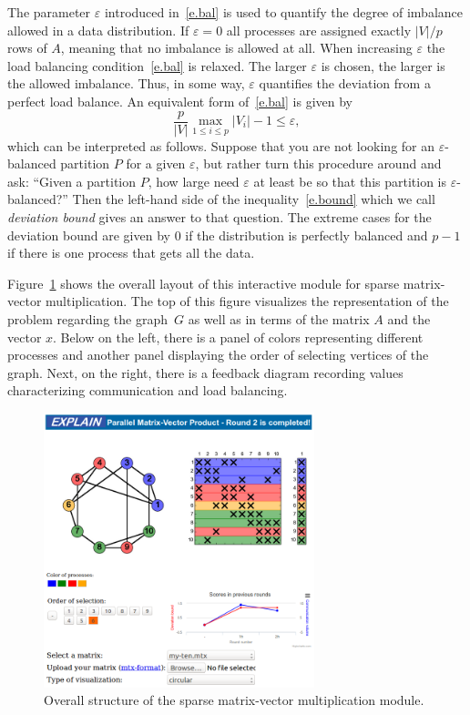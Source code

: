 \documentclass[12pt, twoside,a4paper,toc=bibliography]{scrbook}
\begin{document}
The parameter $\varepsilon$ introduced in~\eqref{e.bal} is used to quantify the degree of
imbalance allowed in a data distribution. If $\varepsilon = 0$ all processes are assigned
exactly $|V|/p$ rows of $A$, meaning that no imbalance is allowed at all. When
increasing $\varepsilon$ the load balancing condition~\eqref{e.bal} is relaxed. The
larger $\varepsilon$ is chosen, the larger is the allowed imbalance. Thus, in some way,
$\varepsilon$ quantifies the deviation from a perfect load balance. An equivalent form
of~\eqref{e.bal} is given by
\begin{equation}\label{e.bound}
\frac{p}{|V|} \max_{1 \leq i \leq p} |V_i| - 1 \leq \varepsilon ,
\end{equation}
which can be interpreted as follows. Suppose that you are not looking for an
$\varepsilon$-balanced partition $P$ for a given $\varepsilon$, but rather turn this
procedure around and ask: ``Given a partition $P$, how large need $\varepsilon$ at least
be so that this partition is $\varepsilon$-balanced?'' Then the left-hand side of the
inequality~\eqref{e.bound} which we call \emph{deviation bound} gives an answer to that
question. The extreme cases for the deviation bound are given by $0$ if the distribution is
perfectly balanced and $p-1$ if there is one process that gets all the data.

Figure~\ref{f.explain.matvec} shows the overall layout of this interactive
module for sparse matrix-vector multiplication.
The top of this figure visualizes
the representation of the problem regarding the graph~$G$ as well as in terms
of the matrix $A$ and the vector $x$. Below on the left, there is a panel of
colors representing different processes and another panel displaying the order of
selecting vertices of the graph. Next, on the right, there is a feedback diagram recording
values characterizing communication and load balancing.

\begin{figure}
\centering
\includegraphics[width=0.7\textwidth]{final}
\caption{Overall structure of the sparse matrix-vector multiplication module.}
\label{f.explain.matvec}
\end{figure}
\end{document}
